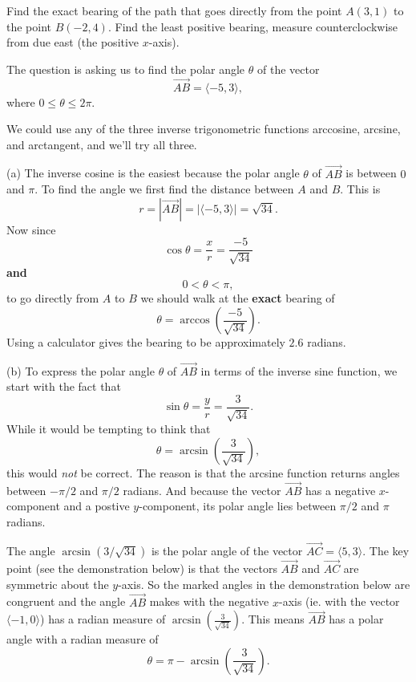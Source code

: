 \documentclass{ximera}
\begin{document}
\begin{example}  \label{Ed4t5t4dt44}
Find the exact bearing of the path that goes directly from the point $A(3,1)$ to the point $B(-2,4)$. Find the least positive bearing, measure counterclockwise from due east (the positive $x$-axis).

\begin{explanation}
The question is asking us to find the polar angle $\theta$ of the vector
\[
      \overrightarrow{AB} = \langle -5, 3  \rangle ,
\]
where $0\leq \theta \leq 2\pi$.

We could use any of the three inverse trigonometric functions arccosine, arcsine, and arctangent, and we'll try all three.

(a) The inverse cosine is the easiest because the polar angle $\theta$ of $\overrightarrow{AB}$ is between $0$ and $\pi$. To find the angle we first find the distance between $A$ and $B$. This is 
\[
   r =      | \overrightarrow{AB} | = | \langle -5, 3  \rangle | = \sqrt{34} .
\]
Now since
\[
   \cos\theta = \frac{x}{r} = \frac{-5}{\sqrt{34}}
\]
{\bf and}
\[
      0< \theta < \pi ,
\]
to go directly from $A$ to $B$ we should walk at the {\bf exact} bearing of
\[
     \theta = \arccos \left(  \frac{-5}{\sqrt{34}}  \right) .
\]
Using a calculator gives the bearing to be approximately $2.6$ radians.

(b) To express the polar angle $\theta$ of $\overrightarrow{AB}$ in terms of the inverse sine function, we start with the fact that
\[
   \sin\theta = \frac{y}{r} = \frac{3}{\sqrt{34}} .
\]
While it would be tempting to think that 
\[
  \theta = \arcsin \left(  \frac{3}{\sqrt{34}}  \right) ,
\]
this would \emph{not} be correct. The reason is that the arcsine function returns angles between $-\pi/2$ and $\pi/2$ radians. And because the vector $\overrightarrow{AB}$ has a negative $x$-component and a postive $y$-component, its polar angle lies between $\pi/2$ and $\pi$ radians.

The angle $\arcsin(3/\sqrt{34})$ is the polar angle of the vector $\overrightarrow{AC} = \langle 5, 3 \rangle$. The key point  (see the demonstration below) is that the vectors $\overrightarrow{AB}$ and $\overrightarrow{AC}$ are symmetric about the $y$-axis. So the marked angles in the demonstration below are congruent and the angle $\overrightarrow{AB}$ makes with the negative $x$-axis (ie. with the vector $\langle -1,0\rangle$) has a radian measure of $ \arcsin \left(  \frac{3}{\sqrt{34}}  \right)$. This means $\overrightarrow{AB}$ has a polar angle with a radian measure of 
\[
   \theta = \pi - \arcsin  \left(  \frac{3}{\sqrt{34}}  \right) .
\]




\end{explanation}
\end{example}
\end{document}
